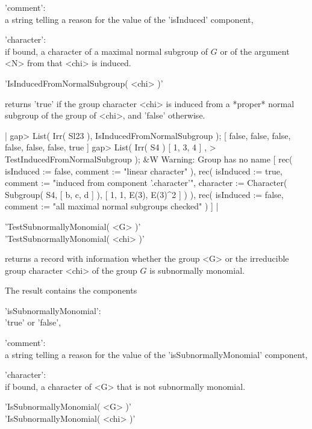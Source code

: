'comment':   \\ a string telling a reason for the value of the
                'isInduced' component,

'character': \\ if bound, a character of a maximal normal subgroup of $G$
                or of the argument <N> from that <chi> is induced.

\vspace{5mm}

'IsInducedFromNormalSubgroup( <chi> )'

returns 'true' if the group character <chi> is induced from a *proper*
normal subgroup of the group of <chi>, and 'false' otherwise.

|    gap> List( Irr( Sl23 ), IsInducedFromNormalSubgroup );
    [ false, false, false, false, false, false, true ]
    gap> List( Irr( S4 ){ [ 1, 3, 4 ] },
    >          TestInducedFromNormalSubgroup );
    &W  Warning: Group has no name
    [ rec(
          isInduced := false,
          comment := "linear character" ), rec(
          isInduced := true,
          comment := "induced from component '.character'",
          character := Character( Subgroup( S4, [ b, c, d ] ), 
            [ 1, 1, E(3), E(3)^2 ] ) ), rec(
          isInduced := false,
          comment := "all maximal normal subgroups checked" ) ] |


'TestSubnormallyMonomial( <G> )'\\
'TestSubnormallyMonomial( <chi> )'

returns a record with information whether the group <G> or the
irreducible group character <chi> of the group $G$ is subnormally
monomial.

The result contains the components

'isSubnormallyMonomial': \\ 'true' or 'false',

'comment':   \\ a string telling a reason for the value of the
                'isSubnormallyMonomial' component,

'character': \\ if bound, a character of <G> that is not
                subnormally monomial.

\vspace{5mm}

'IsSubnormallyMonomial( <G> )'%
\\
'IsSubnormallyMonomial( <chi> )'

